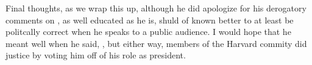 
\par
Final thoughts, as we wrap this up, although he did apologize for his derogatory
comments on , as well educated
as he is, shuld of known better to at least be politcally correct when he speaks
to a public audience. I would hope that he meant well when he said, , but either way, members of the Harvard
commity did justice by voting him off of his role as president.

\clearpage